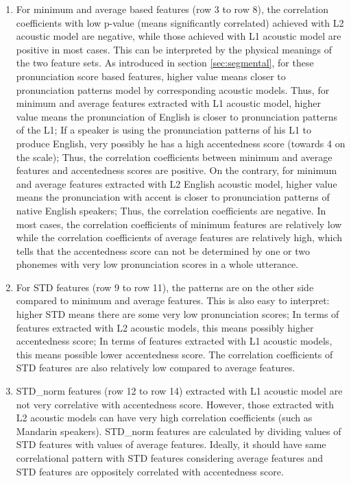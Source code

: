 \begin{enumerate}
 \item For minimum and average based features (row 3 to row 8), the correlation coefficients with low p-value (means significantly correlated) achieved with L2 acoustic model are negative, while those achieved with L1 acoustic model are positive in most cases. This can be interpreted by the physical meanings of the two feature sets. As introduced in section \ref{sec:segmental}, for these pronunciation score based features, higher value means closer to pronunciation patterns model by corresponding acoustic models. Thus, for minimum and average features extracted with L1 acoustic model, higher value means the pronunciation of English is closer to pronunciation patterns of the L1; If a speaker is using the pronunciation patterns of his L1 to produce English, very possibly he has a high accentedness score (towards 4 on the scale); Thus, the correlation coefficients between minimum and average features and accentedness scores are positive. On the contrary, for minimum and average features extracted with L2 English acoustic model, higher value means the pronunciation with accent is closer to pronunciation patterns of native English speakers; Thus, the correlation coefficients are negative. In most cases, the correlation coefficients of minimum features are relatively low while the correlation coefficients of average features are relatively high, which tells that the accentedness score can not be determined by one or two phonemes with very low pronunciation scores in a whole utterance.
 \item For STD features (row 9 to row 11), the patterns are on the other side compared to minimum and average features. This is also easy to interpret: higher STD means there are some very low pronunciation scores; In terms of features extracted with L2 acoustic models, this means possibly higher accentedness score; In terms of features extracted with L1 acoustic models, this means possible lower accentedness score. The correlation coefficients of STD features are also relatively low compared to average features.
 \item STD\_norm features (row 12 to row 14) extracted with L1 acoustic model are not very correlative with accentedness score. However, those extracted with L2 acoustic models can have very high correlation coefficients (such as Mandarin speakers). STD\_norm features are calculated by dividing values of STD features with values of average features. Ideally, it should have same correlational pattern with STD features considering average features and STD features are oppositely correlated with accentedness score.

\end{enumerate}
